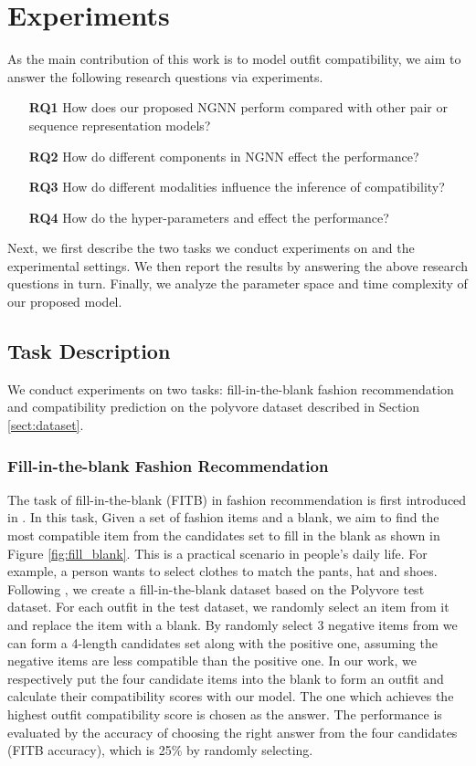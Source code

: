 \documentclass[sigconf]{acmart}
\begin{document}
\section{Experiments}
As the main contribution of this work is to model outfit compatibility, we aim to answer the following research questions via experiments.
\begin{itemize}
\item[\textbf{RQ1}]
 How does our proposed NGNN perform compared with other pair or sequence representation models?
\item[\textbf{RQ2}]
 How do different components in NGNN effect the performance?
\item[\textbf{RQ3}]
 How do different modalities influence the inference of compatibility?
\item[\textbf{RQ4}]
 How do the hyper-parameters  and  effect the performance?
\end{itemize}
 Next, we first describe the two tasks we conduct experiments on and the experimental settings. We then report the results by answering the above research questions in turn.
 Finally, we analyze the parameter space and time complexity of our proposed model.

\subsection{Task Description}
We conduct experiments on two tasks: fill-in-the-blank fashion recommendation and compatibility prediction on the polyvore dataset described in Section \ref{sect:dataset}.

\subsubsection{Fill-in-the-blank Fashion Recommendation}
The task of fill-in-the-blank (FITB) in fashion recommendation is first introduced in \cite{han2017learning}. In this task,
Given a set of fashion items and a blank, we aim to find the most compatible item from the candidates set to fill in the blank as shown in Figure \ref{fig:fill_blank}. This is a practical scenario in people's daily life. For example, a person wants to select clothes to match the pants, hat and shoes.
Following \cite{han2017learning}, we create a fill-in-the-blank dataset based on the Polyvore test dataset. For each outfit in the test dataset, we randomly select an item from it and replace the item with a blank. By randomly select 3 negative items from  we can form a 4-length candidates set along with the positive one, assuming the negative items are less compatible than the positive one.
In our work, we respectively put the four candidate items into the blank to form an outfit and calculate their compatibility scores with our model. The one which achieves the highest outfit compatibility score is chosen as the answer.
The performance is evaluated by the accuracy of choosing the right answer from the four candidates (FITB accuracy), which is 25\% by randomly selecting.
\end{document}
